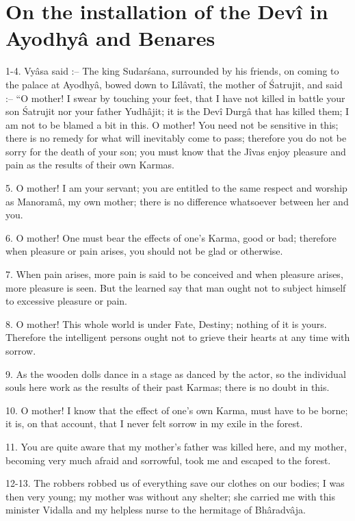 ﻿\chapter{On the installation of the Dev\^i in Ayodhy\^a and Benares}

1-4. Vy\^asa said :-- The king Sudar\'sana, surrounded by his friends, on coming to the palace at Ayodhy\^a, bowed down to L\^il\^avat\^i, the mother of \'Satrujit, and said :-- ``O mother! I swear by touching your feet, that I have not killed in battle your son \'Satrujit nor your father Yudh\^ajit; it is the Dev\^i Durg\^a that has killed them; I am not to be blamed a bit in this. O mother! You need not be sensitive in this; there is no remedy for what will inevitably come to pass; therefore you do not be sorry for the death of your son; you must know that the J\^ivas enjoy pleasure and pain as the results of their own Karmas.

5. O mother! I am your servant; you are entitled to the same respect and worship as Manoram\^a, my own mother; there is no difference whatsoever between her and you.

6. O mother! One must bear the effects of one's Karma, good or bad; therefore when pleasure or pain arises, you should not be glad or otherwise.

7. When pain arises, more pain is said to be conceived and when pleasure arises, more pleasure is seen. But the learned say that man ought not to subject himself to excessive pleasure or pain.

8. O mother! This whole world is under Fate, Destiny; nothing of it is yours. Therefore the intelligent persons ought not to grieve their hearts at any time with sorrow.

9. As the wooden dolls dance in a stage as danced by the actor, so the individual souls here work as the results of their past Karmas; there is no doubt in this.

10. O mother! I know that the effect of one's own Karma, must have to be borne; it is, on that account, that I never felt sorrow in my exile in the forest.

11. You are quite aware that my mother's father was killed here, and my mother, becoming very much afraid and sorrowful, took me and escaped to the forest.

12-13. The robbers robbed us of everything save our clothes on our bodies; I was then very young; my mother was without any shelter; she carried me with this minister Vidalla and my helpless nurse to the hermitage of Bh\^aradv\^aja.


